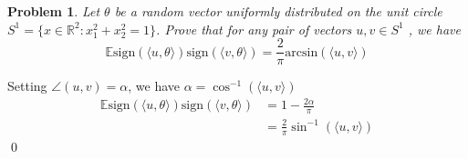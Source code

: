 \documentclass[12pt]{article}
\newtheorem{ex}{Problem}
\begin{document}
\begin{bx}
	
	\begin{ex}
		Let $\theta$ be a random vector uniformly distributed on the unit circle $S^1 = \{x \in \mathbb{R}^2 :
			x_1^2 + x_2^2 = 1\}$. Prove that for any pair of vectors $u,v \in S^1$ , we have
			\[
			\mathbb{E}\mathrm{sign}(\langle u,\theta\rangle)\mathrm{sign}(\langle v,\theta\rangle) = \frac{2}{\pi}\mathrm{arcsin}(\langle u,v\rangle)
			\]
	\end{ex}
	\tcblower
	Setting $\angle(u,v)=\alpha$, we have $\alpha =\cos^{-1}(\langle u,v\rangle)$
	\begin{align*} 
		\mathbb{E}\mathrm{sign}(\langle u,\theta\rangle)\mathrm{sign}(\langle v,\theta\rangle) &= 1-\frac{2\alpha}{\pi} \\
		&= \frac{2}{\pi}\sin^{-1}(\langle u,v \rangle)
	\end{align*}
	\qed
\end{bx}
\end{document}
